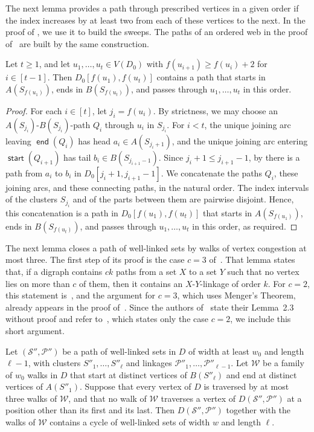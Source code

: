 \documentclass[fontsize=12pt,leading=14pt]{fullpaper}
\DeclareMathOperator{\st}{\mathsf{start}}
\DeclareMathOperator{\en}{\mathsf{end}}
\newcommand{\Pcal}{\mathcal{P}}
\newcommand{\Scal}{\mathcal{S}}
\newcommand{\Wcal}{\mathcal{W}}
\newcounter{step}
\begin{document}
The next lemma provides a path through prescribed vertices in a given order if the index increases by at least two from each of these vertices to the next.
In the proof of , we use it to build the sweeps.
The paths of an ordered web in the proof of~\cite[Lemma~4.8]{HKMM26b} are built by the same construction.

\begin{lemma}\label{lem:spaced-path}
  Let $t\ge1$, and let $u_1,\dots,u_t\in V(D_0)$ with $f(u_{i+1})\ge f(u_i)+2$ for $i\in[t-1]$.
  Then $D_0[f(u_1),f(u_t)]$ contains a path that starts in $A(S_{f(u_1)})$, ends in $B(S_{f(u_t)})$, and passes through $u_1,\dots,u_t$ in this order.
\end{lemma}

\begin{proof}
  For each $i\in[t]$, let $j_i=f(u_i)$.
  By strictness, we may choose an $A(S_{j_i})$-$B(S_{j_i})$-path $Q_i$ through $u_i$ in $S_{j_i}$.
  For $i<t$, the unique joining arc leaving $\en(Q_i)$ has head $a_i\in A(S_{j_i+1})$, and the unique joining arc entering $\st(Q_{i+1})$ has tail $b_i\in B(S_{j_{i+1}-1})$.
  Since $j_i+1\le j_{i+1}-1$, by  there is a path from $a_i$ to $b_i$ in $D_0[j_i+1,j_{i+1}-1]$.
  We concatenate the paths $Q_i$, these joining arcs, and these connecting paths, in the natural order.
  The index intervals of the clusters $S_{j_i}$ and of the parts between them are pairwise disjoint.
  Hence, this concatenation is a path in $D_0[f(u_1),f(u_t)]$ that starts in $A(S_{f(u_1)})$, ends in $B(S_{f(u_t)})$, and passes through $u_1,\dots,u_t$ in this order, as required.
\end{proof}

The next lemma closes a path of well-linked sets by walks of vertex congestion at most three.
The first step of its proof is the case $c=3$ of~\cite[Lemma~2.3]{HKMM26b}.
That lemma states that, if a digraph contains $ck$ paths from a set $X$ to a set $Y$ such that no vertex lies on more than $c$ of them, then it contains an $X$-$Y$-linkage of order $k$.
For $c=2$, this statement is~\cite[Lemma~2.12(1)]{KawarabayashiK15}, and the argument for $c=3$, which uses Menger's Theorem, already appears in the proof of~\cite[Lemma~5.24]{KawarabayashiK15}.
Since the authors of~\cite{HKMM26b} state their Lemma~2.3 without proof and refer to~\cite{KawarabayashiK15}, which states only the case $c=2$, we include this short argument.

\begin{lemma}\label{lem:close-congestion}
  Let $(\Scal'',\Pcal'')$ be a path of well-linked sets in $D$ of width at least $w_0$ and length $\ell-1$, with clusters $S''_1,\dots,S''_\ell$ and linkages $\Pcal''_1,\dots,\Pcal''_{\ell-1}$.
  Let $\Wcal$ be a family of $w_0$ walks in $D$ that start at distinct vertices of $B(S''_\ell)$ and end at distinct vertices of $A(S''_1)$.
  Suppose that every vertex of $D$ is traversed by at most three walks of $\Wcal$, and that no walk of $\Wcal$ traverses a vertex of $D(\Scal'',\Pcal'')$ at a position other than its first and its last.
  Then $D(\Scal'',\Pcal'')$ together with the walks of $\Wcal$ contains a cycle of well-linked sets of width $w$ and length $\ell$.
\end{lemma}
\end{document}
